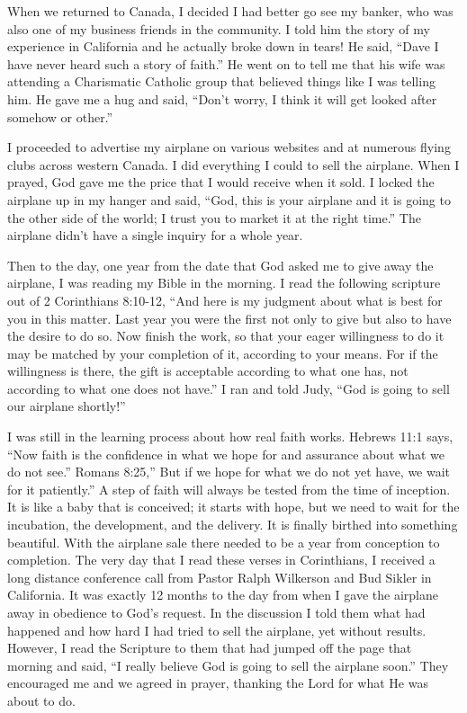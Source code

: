 \documentclass[oneside]{book}
\begin{document}
When we returned to Canada, I decided I had better go see my banker, who was also one of my business friends in the community. I told him the story of my experience in California and he actually broke down in tears! He said, “Dave I have never heard such a story of faith.” He went on to tell me that his wife was attending a Charismatic Catholic group that believed things like I was telling him. He gave me a hug and said, “Don't worry, I think it will get looked after somehow or other.”

I proceeded to advertise my airplane on various websites and at numerous flying clubs across western Canada. I did everything I could to sell the airplane. When I prayed, God gave me the price that I would receive when it sold. I locked the airplane up in my hanger and said, “God, this is your airplane and it is going to the other side of the world; I trust you to market it at the right time.” The airplane didn't have a single inquiry for a whole year. 

Then to the day, one year from the date that God asked me to give away the airplane, I was reading my Bible in the morning. I read the following scripture out of 2 Corinthians 8:10-12, “And here is my judgment about what is best for you in this matter. Last year you were the first not only to give but also to have the desire to do so. Now finish the work, so that your eager willingness to do it may be matched by your completion of it, according to your means. For if the willingness is there, the gift is acceptable according to what one has, not according to what one does not have.” I ran and told Judy, “God is going to sell our airplane shortly!” 

I was still in the learning process about how real faith works. Hebrews 11:1 says, “Now faith is the confidence in what we hope for and assurance about what we do not see.” Romans 8:25,” But if we hope for what we do not yet have, we wait for it patiently.” A step of faith will always be tested from the time of inception. It is like a baby that is conceived; it starts with hope, but we need to wait for the incubation, the development, and the delivery. It is finally birthed into something beautiful. With the airplane sale there needed to be a year from conception to completion. The very day that I read these verses in Corinthians, I received a long distance conference call from Pastor Ralph Wilkerson and Bud Sikler in California. It was exactly 12 months to the day from when I gave the airplane away in obedience to God's request. In the discussion I told them what had happened and how hard I had tried to sell the airplane, yet without results. However, I read the Scripture to them that had jumped off the page that morning and said, “I really believe God is going to sell the airplane soon.” They encouraged me and we agreed in prayer, thanking the Lord for what He was about to do.
\end{document}
